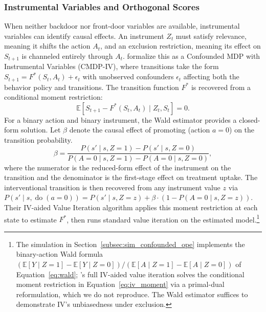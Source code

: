 \subsubsection{Instrumental Variables and Orthogonal Scores}
\label{subsubsec:iv_orthogonal}

When neither backdoor nor front-door variables are available, instrumental variables can identify causal effects. An instrument $Z_t$ must satisfy relevance, meaning it shifts the action $A_t$, and an exclusion restriction, meaning its effect on $S_{t+1}$ is channeled entirely through $A_t$. \citet{liao2024_iv_rl} formalize this as a Confounded MDP with Instrumental Variables (CMDP-IV), where transitions take the form $S_{t+1} = F^*(S_t, A_t) + \epsilon_t$ with unobserved confounders $\epsilon_t$ affecting both the behavior policy and transitions. The transition function $F^*$ is recovered from a conditional moment restriction:
\begin{equation}
\mathbb{E}[S_{t+1} - F^*(S_t, A_t) \mid Z_t, S_t] = 0.
\label{eq:iv_moment}
\end{equation}
For a binary action and binary instrument, the Wald estimator provides a closed-form solution. Let $\beta$ denote the causal effect of promoting (action $a = 0$) on the transition probability.
\begin{equation}
\beta = \frac{P(s' \mid s, Z{=}1) - P(s' \mid s, Z{=}0)}{P(A{=}0 \mid s, Z{=}1) - P(A{=}0 \mid s, Z{=}0)},
\label{eq:wald}
\end{equation}
where the numerator is the reduced-form effect of the instrument on the transition and the denominator is the first-stage effect on treatment uptake. The interventional transition is then recovered from any instrument value $z$ via $P(s' \mid s, \operatorname{do}(a{=}0)) = P(s' \mid s, Z{=}z) + \beta \cdot (1 - P(A{=}0 \mid s, Z{=}z))$. Their IV-aided Value Iteration algorithm applies this moment restriction at each state to estimate $F^*$, then runs standard value iteration on the estimated model.\footnote{The simulation in Section~\ref{subsec:sim_confounded_ope} implements the binary-action Wald formula $(\mathbb{E}[Y \mid Z{=}1] - \mathbb{E}[Y \mid Z{=}0]) / (\mathbb{E}[A \mid Z{=}1] - \mathbb{E}[A \mid Z{=}0])$ of Equation~\eqref{eq:wald}; \citet{liao2024_iv_rl}'s full IV-aided value iteration solves the conditional moment restriction in Equation~\eqref{eq:iv_moment} via a primal-dual reformulation, which we do not reproduce. The Wald estimator suffices to demonstrate IV's unbiasedness under exclusion.}

